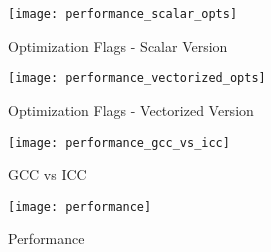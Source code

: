 \begin{figure}[H]
  \texttt{[image: performance\_scalar\_opts]}
  \caption{Optimization Flags - Scalar Version}
  \label{fig:perf_vec}
\end{figure}

\begin{figure}[H]
  \texttt{[image: performance\_vectorized\_opts]}
  \caption{Optimization Flags - Vectorized Version}
  \label{fig:perf_scal}
\end{figure}

\begin{figure}[H]
  \texttt{[image: performance\_gcc\_vs\_icc]}
  \caption{GCC vs ICC}
  \label{fig:perf_gcc_vs_icc}
\end{figure}



\begin{figure}[!ht]
  \texttt{[image: performance]}
  \caption{Performance}
\end{figure}






